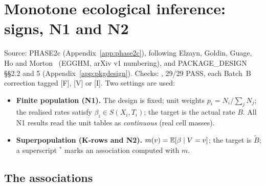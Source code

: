 \section{Monotone ecological inference: signs, N1 and N2}\label{sec:monotone}

Source: PHASE2c (Appendix~\ref{app:phase2c}), following Elzayn, Goldin, Guage,
Ho and Morton~\citep{egghm2025} (EGGHM, arXiv v1 numbering), and PACKAGE\_DESIGN
\S\S2.2 and 5 (Appendix~\ref{app:pkgdesign}). Checks: ,
29/29 PASS, each Batch~B correction tagged [F], [V] or [I]. Two settings are used:
\begin{itemize}[nosep]
\item \textbf{Finite population (N1).} The design is fixed; unit weights
$p_i=N_i/\sum_jN_j$; the realised rates satisfy $\beta_i\in S(X_i,T_i)$; the
target is the actual rate $B$. All N1 results read the unit tables as
\emph{continuous} (real cell masses).
\item \textbf{Superpopulation (K-rows and N2).} $m(v)=\mathbb E[\beta\mid V=v]$; the
target is $\tilde B$; a superscript $^*$ marks an association computed with $m$.
\end{itemize}

\subsection{The associations}

